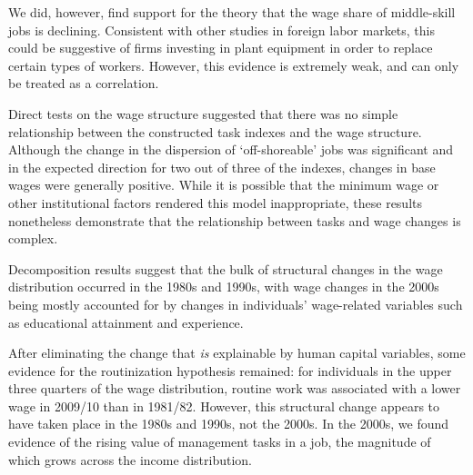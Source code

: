 We did, however, find support for the theory that the wage share of middle-skill jobs is declining. Consistent with other studies in foreign labor markets, this could be suggestive of firms investing in plant equipment in order to replace certain types of workers. However, this evidence is extremely weak, and can only be treated as a correlation.

Direct tests on the wage structure suggested that there was no simple relationship between the constructed task indexes and the wage structure. Although the change in the dispersion of `off-shoreable' jobs was significant and in the expected direction for two out of three of the indexes, changes in base wages were generally positive. While it is possible that the minimum wage or other institutional factors rendered this model inappropriate, these results nonetheless demonstrate that the relationship between tasks and wage changes is complex.

Decomposition results suggest that the bulk of structural changes in the wage distribution occurred in the 1980s and 1990s, with wage changes in the 2000s being mostly accounted for by changes in individuals' wage-related variables such as educational attainment and experience.

After eliminating the change that {\em is} explainable by human capital variables, some evidence for the routinization hypothesis remained: for individuals in the upper three quarters of the wage distribution, routine work was associated with a lower wage in 2009/10 than in 1981/82. However, this structural change appears to have taken place in the 1980s and 1990s, not the 2000s. In the 2000s, we found evidence of the rising value of management tasks in a job, the magnitude of which grows across the income distribution. 

